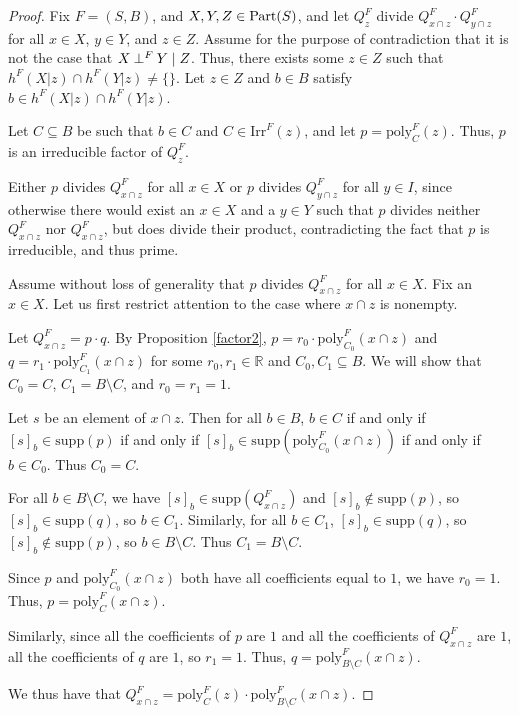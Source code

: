 \documentclass[authordate,onecolumn]{miri-tech-article}
\begin{document}
\begin{proof}
Fix $F=(S,B)$, and $X,Y,Z\in \text{Part}(S)$, and let $Q^F_z$ divide $Q^F_{x\cap z} \cdot Q^F_{y\cap z}$ for all $x\in X$, $y\in Y$, and $z\in Z$. Assume for the purpose of contradiction that it is not the case that $X\mathbin{\perp^{F}}Y\mid Z$. Thus, there exists some $z\in Z$ such that $h^F(X|z)\cap h^F(Y|z)\neq \{\}$. Let $z\in Z$ and $b\in B$ satisfy $b\in h^F(X|z)\cap h^F(Y|z)$. 

Let $C\subseteq B$ be such that $b\in C$ and $C\in \text{Irr}^F(z)$, and let $p=\text{poly}^F_C(z)$. Thus, $p$ is an irreducible factor of $Q^F_z$.

Either $p$ divides $Q^F_{x\cap z}$ for all $x\in X$ or $p$ divides $Q^F_{y\cap z}$ for all $y\in I$, since otherwise there would exist an $x\in X$ and a $y\in Y$ such that $p$ divides neither $Q^F_{x\cap z}$ nor $Q^F_{x\cap z}$, but does divide their product, contradicting the fact that $p$ is irreducible, and thus prime.

Assume without loss of generality that $p$ divides $Q^F_{x\cap z}$ for all $x\in X$. Fix an $x\in X$. Let us first restrict attention to the case where $x\cap z$ is nonempty. 

Let $Q^F_{x\cap z}=p\cdot q$. By Proposition \ref{factor2},  $p=r_0\cdot \text{poly}^F_{C_0}(x\cap z)$ and $q=r_1\cdot \text{poly}^F_{C_1}(x\cap z)$ for some $r_0,r_1\in \mathbb R$ and $C_0,C_1\subseteq B$. We will show that $C_0=C$, $C_1=B\setminus C$, and $r_0=r_1=1$.

 Let $s$ be an element of $x\cap z$. Then for all $b\in B$, $b\in C$ if and only if $[s]_b\in \text{supp}(p)$ if and only if $[s]_b\in \text{supp}(\text{poly}^F_{C_0}(x\cap z))$ if and only if $b\in C_0$. Thus $C_0=C$. 

For all $b\in B\setminus C$, we have $[s]_b\in \text{supp}(Q^F_{x\cap z})$ and $[s]_b\notin \text{supp}(p)$, so $[s]_b\in \text{supp}(q)$, so $b\in C_1$. Similarly, for all $b\in C_1$, $[s]_b\in \text{supp}(q)$, so $[s]_b\notin \text{supp}(p)$, so $b\in B\setminus C$. Thus $C_1=B\setminus C$.

Since $p$ and $\text{poly}^F_{C_0}(x\cap z)$ both have all coefficients equal to $1$, we have $r_0=1$. Thus, $p=\text{poly}^F_{C}(x\cap z)$.

Similarly, since all the coefficients of $p$ are $1$ and all the coefficients of $Q^F_{x\cap z}$ are $1$, all the coefficients of $q$ are $1$, so $r_1=1$. Thus, $q=\text{poly}^F_{B\setminus C}(x\cap z)$.

We thus have that $Q^F_{x\cap z}= \text{poly}^F_{C}(z)\cdot \text{poly}^F_{B\setminus C}(x\cap z)$.


\end{proof}
\end{document}
